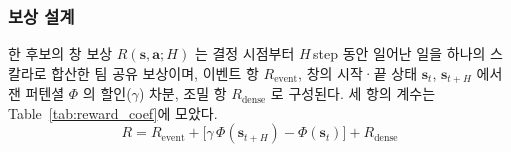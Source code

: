 \subsubsection{보상 설계}
\label{sec:reward}

한 후보의 창 보상 $R(\mathbf{s}, \mathbf{a}; H)$ 는 결정 시점부터 $H$\,step 동안 일어난
일을 하나의 스칼라로 합산한 팀 공유 보상이며, 이벤트 항 $R_\mathrm{event}$, 창의 시작·끝
상태 $\mathbf{s}_t$, $\mathbf{s}_{t+H}$ 에서 잰 퍼텐셜 $\Phi$ 의 할인($\gamma$) 차분, 조밀 항
$R_\mathrm{dense}$ 로 구성된다. 세 항의 계수는 Table~\ref{tab:reward_coef}에 모았다.
\begin{equation}
R = R_\mathrm{event} + \big[\gamma\,\Phi(\mathbf{s}_{t+H}) - \Phi(\mathbf{s}_t)\big] + R_\mathrm{dense}
\label{eq:reward}
\end{equation}

